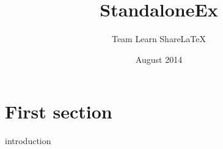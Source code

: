 \documentclass{article}
\title{StandaloneEx}
\author{Team Learn ShareLaTeX}
\date{August 2014}
\begin{document}
 
    \maketitle
 
    \section{First section}
    {introduction}
 
 
\end{document}
